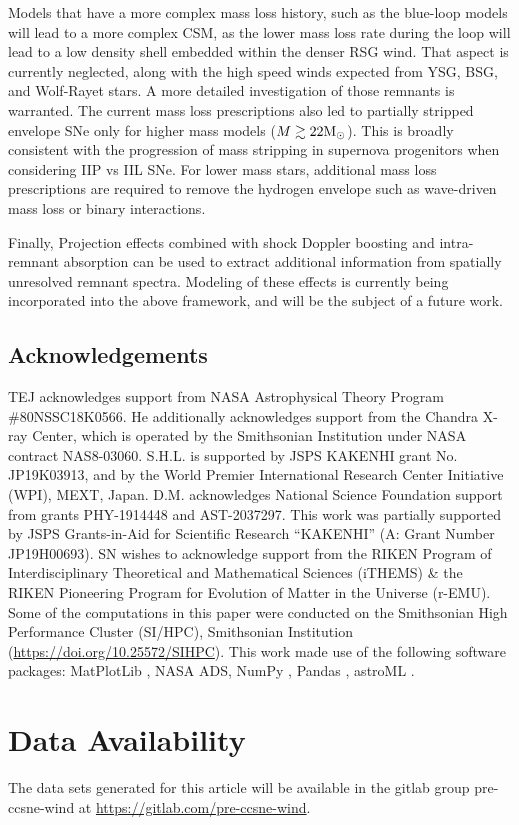 \documentclass[twocolumn]{aastex631}
\begin{document}
Models that have a more complex mass loss history, such as the blue-loop models will lead to a more complex CSM, as the lower mass loss rate during the loop will lead to a low density shell embedded within the denser RSG wind. That aspect is currently neglected, along with the high speed winds expected from YSG, BSG, and Wolf-Rayet stars. A more detailed investigation of those remnants is warranted. The current mass loss prescriptions also led to partially stripped envelope SNe only for higher mass models ($M\gtrsim22\rm M_{\odot}$). This is broadly consistent with the progression of mass stripping in supernova progenitors when considering IIP vs IIL SNe. For lower mass stars, additional mass loss prescriptions are required to remove the hydrogen envelope such as wave-driven mass loss or binary interactions.

Finally, Projection effects combined with shock Doppler boosting and intra-remnant absorption can be used to extract additional information from spatially unresolved remnant spectra. Modeling of these effects is currently being incorporated into the above framework, and will be the subject of a future work.

\begin{acknowledgements}
\section*{Acknowledgements}
\label{acknowledgements}
TEJ acknowledges support from NASA Astrophysical Theory Program \#80NSSC18K0566. He additionally acknowledges support from the Chandra X-ray Center, which is operated by the Smithsonian Institution under NASA contract NAS8-03060. S.H.L.
is supported by JSPS KAKENHI grant No. JP19K03913, and by the World Premier International Research Center Initiative (WPI), MEXT, Japan. D.M. acknowledges National Science Foundation support from grants PHY-1914448 and AST-2037297. This work was partially supported by JSPS Grants-in-Aid for Scientific Research “KAKENHI” (A: Grant Number JP19H00693). SN wishes to acknowledge support from the RIKEN Program of Interdisciplinary Theoretical and Mathematical Sciences (iTHEMS) \& the RIKEN Pioneering Program for Evolution of Matter in the Universe (r-EMU). Some of the computations in this paper were conducted on the Smithsonian High Performance Cluster (SI/HPC), Smithsonian Institution (\url{https://doi.org/10.25572/SIHPC}).
This work made use of the following software packages: MatPlotLib \citep{Hunter:2007}, NASA ADS, NumPy \citep{van2011numpy}, Pandas \citep{pandas}, astroML \citep{astroML}.
\end{acknowledgements}
\section*{Data Availability}

The data sets generated for this article will be available in the gitlab group pre-ccsne-wind at \url{https://gitlab.com/pre-ccsne-wind}. 


\end{document}
